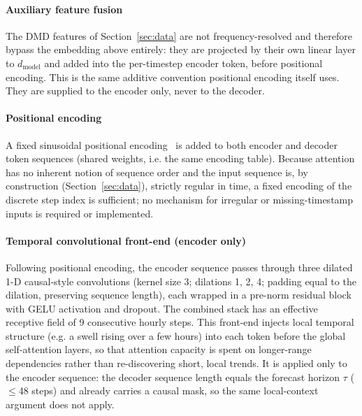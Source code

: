 \paragraph{Auxiliary feature fusion}
The DMD features of Section~\ref{sec:data} are not frequency-resolved and therefore bypass the embedding above entirely: they are projected by their own linear layer to $d_{\text{model}}$ and added into the per-timestep encoder token, before positional encoding. This is the same additive convention positional encoding itself uses. They are supplied to the encoder only, never to the decoder.

\paragraph{Positional encoding}
A fixed sinusoidal positional encoding~\cite{vaswani2017attention} is added to both encoder and decoder token sequences (shared weights, i.e. the same encoding table). Because attention has no inherent notion of sequence order and the input sequence is, by construction (Section~\ref{sec:data}), strictly regular in time, a fixed encoding of the discrete step index is sufficient; no mechanism for irregular or missing-timestamp inputs is required or implemented.

\paragraph{Temporal convolutional front-end (encoder only)}
Following positional encoding, the encoder sequence passes through three dilated 1-D causal-style convolutions (kernel size 3; dilations 1, 2, 4; padding equal to the dilation, preserving sequence length), each wrapped in a pre-norm residual block with GELU activation and dropout. The combined stack has an effective receptive field of 9 consecutive hourly steps. This front-end injects local temporal structure (e.g. a swell rising over a few hours) into each token before the global self-attention layers, so that attention capacity is spent on longer-range dependencies rather than re-discovering short, local trends. It is applied only to the encoder sequence: the decoder sequence length equals the forecast horizon $\tau$ ($\leq$48 steps) and already carries a causal mask, so the same local-context argument does not apply.

